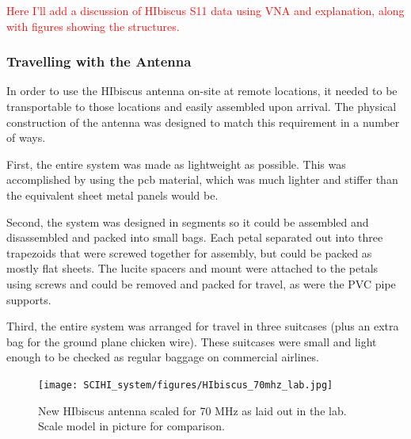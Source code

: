 \textcolor{red}{Here I'll add a discussion of HIbiscus S11 data using VNA and explanation, along with figures showing the structures.}

\subsubsection{Travelling with the Antenna}
In order to use the HIbiscus antenna on-site at remote locations, it needed to be transportable to those locations and easily assembled upon arrival. The physical construction of the antenna was designed to match this requirement in a number of ways. 

First, the entire system was made as lightweight as possible. This was accomplished by using the pcb material, which was much lighter and stiffer than the equivalent sheet metal panels would be. 

Second, the system was designed in segments so it could be assembled and disassembled and packed into small bags. Each petal separated out into three trapezoids that were screwed together for assembly, but could be packed as mostly flat sheets. The lucite spacers and mount were attached to the petals using screws and could be removed and packed for travel, as were the PVC pipe supports. 

Third, the entire system was arranged for travel in three suitcases (plus an extra bag for the ground plane chicken wire). These suitcases were small and light enough to be checked as regular baggage on commercial airlines. 

\begin{figure}[htb]
\begin{center}
\texttt{[image: SCIHI\_system/figures/HIbiscus\_70mhz\_lab.jpg]}
\caption{New HIbiscus antenna scaled for 70 MHz as laid out in the lab. Scale model in picture for comparison.}
\label{Fig:hibiscus_70}
\end{center}
\end{figure}



